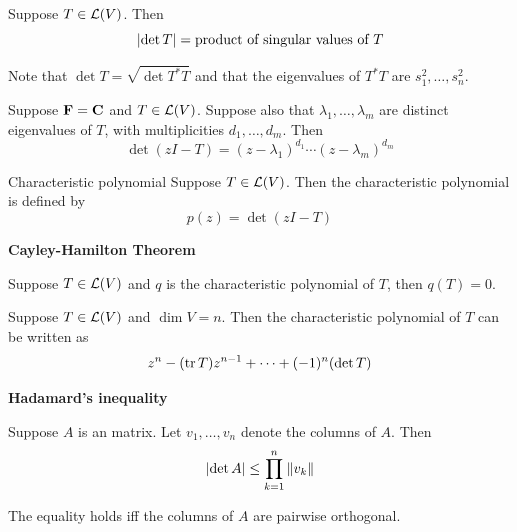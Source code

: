\documentclass[12pt,a4paper]{article}
\begin{document}
    \begin{prop}
        Suppose $T\in\mathcal{L}(V)$. Then
        $$
        \left\lvert \det T\right\rvert=\text{product of singular values of }T
        $$
    \end{prop}
    \begin{remark}
        Note that $\det T=\sqrt{\det T^*T}$ and that the eigenvalues of $T^*T$ are $s_1^2,\dots,s_n^2$.
    \end{remark}
    \hfill
    
    \begin{prop}
        Suppose $\mathbf{F}=\mathbf{C}$ and $T\in\mathcal{L}(V)$. Suppose also that $\lambda_1,\dots,\lambda_m$ are distinct eigenvalues of $T$, with multiplicities $d_1,\dots,d_m$. Then
        $$
        \det(zI-T)=(z-\lambda_1)^{d_1}\cdots(z-\lambda_m)^{d_m}
        $$
    \end{prop}
    \hfill

    \begin{defi}{Characteristic polynomial}
        Suppose $T\in\mathcal{L}(V)$. Then the characteristic polynomial is defined by
        $$
        p(z)=\det(zI-T)
        $$
    \end{defi}
    \begin{thm}
        \textbf{Cayley-Hamilton Theorem}

        Suppose $T\in\mathcal{L}(V)$ and $q$ is the characteristic polynomial of $T$, then $q(T)=0$.
    \end{thm}
    \hfill

    \begin{prop}
        Suppose $T\in\mathcal{L}(V)$ and $\dim V=n$. Then the characteristic polynomial of $T$ can be written as
        $$
        z^n-(\operatorname{tr} T)z^{n-1}+\cdots+(-1)^n(\det T)
        $$
    \end{prop}
    \hfill

    \begin{prop}
        \textbf{Hadamard’s inequality}
        
        Suppose $A$ is an  matrix. Let $v_1,\dots,v_n$ denote the columns of $A$. Then
        $$
        \left\lvert \det A\right\rvert\leq\prod_{k=1}^n\left\lVert v_k\right\rVert
        $$
    \end{prop}
    \begin{remark}
        The equality holds iff the columns of $A$ are pairwise orthogonal.
    \end{remark}
    \hfill
\end{document}
